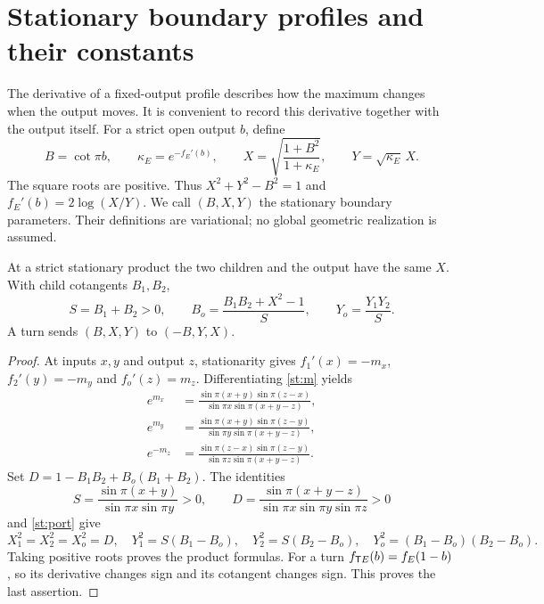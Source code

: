 \section{Stationary boundary profiles and their constants}\label{st:profile-section}
The derivative of a fixed-output profile describes how the
maximum changes when the output moves. It is convenient to
record this derivative together with the output itself.
For a strict open output $b$, define
\begin{equation}\label{st:port}
 B=\cot\pi b,\qquad \kappa_E=e^{-f_E'(b)},\qquad
 X=\sqrt{\frac{1+B^2}{1+\kappa_E}},\qquad
 Y=\sqrt{\kappa_E}\,X .
\end{equation}
The square roots are positive. Thus
$X^2+Y^2-B^2=1$ and $f_E'(b)=2\log(X/Y)$.
We call $(B,X,Y)$ the stationary boundary parameters.
Their definitions are variational; no global geometric
realization is assumed.

\begin{lemma}\label{st:port-product}
At a strict stationary product the two children and the
output have the same $X$. With child cotangents $B_1,B_2$,
\begin{equation}\label{st:port-product-equations}
 S=B_1+B_2>0,\qquad
 B_o=\frac{B_1B_2+X^2-1}{S},\qquad
 Y_o=\frac{Y_1Y_2}{S}.
\end{equation}
A turn sends $(B,X,Y)$ to $(-B,Y,X)$.
\end{lemma}
\begin{proof}
At inputs $x,y$ and output $z$, stationarity gives
$f_1'(x)=-m_x$, $f_2'(y)=-m_y$ and $f_o'(z)=m_z$.
Differentiating \eqref{st:m} yields
\begin{align*}
 e^{m_x}&=\frac{\sin\pi(x+y)\sin\pi(z-x)}
                  {\sin\pi x\sin\pi(x+y-z)},\\
 e^{m_y}&=\frac{\sin\pi(x+y)\sin\pi(z-y)}
                  {\sin\pi y\sin\pi(x+y-z)},\\
 e^{-m_z}&=\frac{\sin\pi(z-x)\sin\pi(z-y)}
                  {\sin\pi z\sin\pi(x+y-z)}.
\end{align*}
Set $D=1-B_1B_2+B_o(B_1+B_2)$. The identities
\[
 S=\frac{\sin\pi(x+y)}{\sin\pi x\sin\pi y}>0,\qquad
 D=\frac{\sin\pi(x+y-z)}
          {\sin\pi x\sin\pi y\sin\pi z}>0
\]
and \eqref{st:port} give
\[
 X_1^2=X_2^2=X_o^2=D,\quad
 Y_1^2=S(B_1-B_o),\quad Y_2^2=S(B_2-B_o),\quad
 Y_o^2=(B_1-B_o)(B_2-B_o).
\]
Taking positive roots proves the product formulas.
For a turn $f_{\mathsf T E}(b)=f_E(1-b)$, so its derivative
changes sign and its cotangent changes sign. This
proves the last assertion.
\end{proof}


